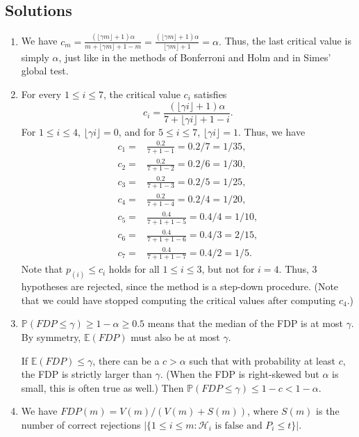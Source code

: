 \documentclass[11pt]{article}
\theoremstyle{plain}
\theoremstyle{definition}
\newcommand{\Hy}{\mathcal{H}}
\newcommand{\pr}{\mathbb{P}}
\begin{document}
\begin{sols}
\subsection{Solutions}


\begin{enumerate}
\item
We have $c_m = \frac{(\lfloor\gamma m\rfloor +1 )\alpha}{m+ \lfloor\gamma m\rfloor +1-m } =
\frac{(\lfloor\gamma m\rfloor +1 )\alpha}{\lfloor\gamma m\rfloor +1} =\alpha.$ Thus, the last critical value is simply $\alpha$, just like in the methods of Bonferroni and Holm and in Simes' global test.
  
\item
For every $1\leq i \leq 7$, the critical value $c_i$ satisfies
$$c_i = \frac{(\lfloor \gamma i \rfloor +1 )\alpha}{7+\lfloor \gamma i \rfloor +1-i }.$$
For $1\leq i \leq 4$, $\lfloor \gamma i \rfloor=0$, and for $5\leq i \leq 7$, $\lfloor \gamma i \rfloor=1$. Thus, we have
\begin{align*}
c_1=& \frac{0.2}{7+1-1} = 0.2/7 =1/35,\\
c_2=& \frac{0.2}{7+1-2} = 0.2/6 =1/30,\\
c_3=& \frac{0.2}{7+1-3} = 0.2/5 =1/25,\\
c_4=& \frac{0.2}{7+1-4} = 0.2/4 =1/20,\\
c_5=& \frac{0.4}{7+1+1-5} = 0.4/4 =1/10,\\
c_6=& \frac{0.4}{7+1+1-6} = 0.4/3 =2/15,\\
c_7=& \frac{0.4}{7+1+1-7} = 0.4/2 =1/5.
\end{align*} 
Note that $p_{(i)}\leq c_i$ holds for all $1\leq i \leq 3$, but not for $i=4$. Thus, 3 hypotheses are rejected, since the method is a step-down procedure. (Note that we could have stopped computing the critical values after computing $c_4$.)

  
\item
$\pr(FDP\leq \gamma)\geq 1-\alpha \geq  0.5$ means that the median of the FDP is at most $\gamma$. By symmetry, $\mathbb{E}(FDP)$ must also be at most $\gamma$.
 
If $\mathbb{E}(FDP)\leq \gamma$, there can be a $c>\alpha$ such that with probability at least $c$,  the FDP is strictly larger than $\gamma$. (When the FDP is right-skewed but $\alpha$ is small, this is often true as well.)
Then $\pr(FDP\leq \gamma)\leq 1-c< 1-\alpha.$
  
\item 
We have $FDP(m)=V(m)/(V(m)+S(m))$, where $S(m)$ is the number of correct rejections $|\{1\leq i \leq m: \Hy_i\text{ is false and } P_i\leq t \}|$.
 

\end{enumerate}
\end{sols}
\end{document}
